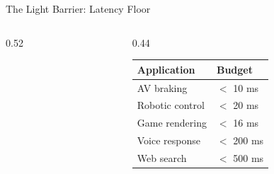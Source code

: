 \documentclass[aspectratio=169, 12pt]{beamer}
\begin{document}
\begin{frame}{The Light Barrier: Latency Floor}
\begin{columns}[T]
\begin{column}{0.52\textwidth}
    \vspace{0.1cm}
  \end{column}
  \begin{column}{0.44\textwidth}
    \vspace{0.3cm}
    \renewcommand{\arraystretch}{1.15}
    {\footnotesize
    \begin{tabular}{@{}ll@{}}
      \toprule
      \textbf{Application} & \textbf{Budget} \\
      \midrule
      AV braking      & $<$ 10 ms \\
      Robotic control  & $<$ 20 ms \\
      Game rendering   & $<$ 16 ms \\
      Voice response   & $<$ 200 ms \\
      Web search       & $<$ 500 ms \\
      \bottomrule
    \end{tabular}
    }
  \end{column}
\end{columns}

\end{frame}
\end{document}

